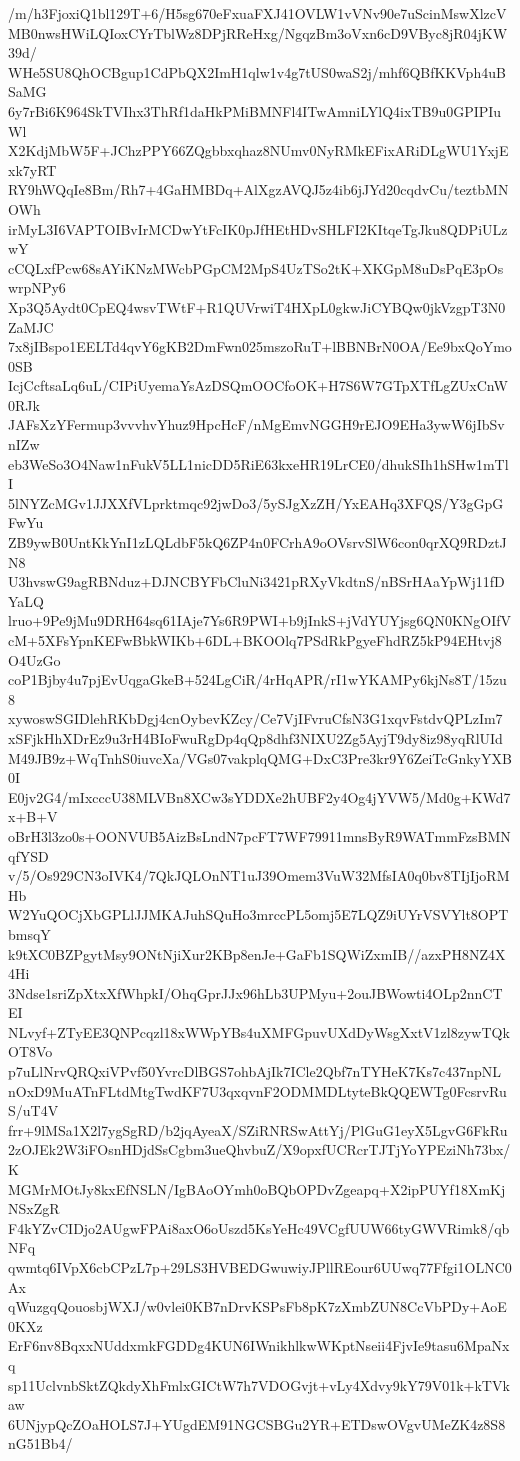 /m/h3FjoxiQ1bl129T+6/H5sg670eFxuaFXJ41OVLW1vVNv90e7uScinMswXlzcV
MB0nwsHWiLQIoxCYrTblWz8DPjRReHxg/NgqzBm3oVxn6cD9VByc8jR04jKW39d/
WHe5SU8QhOCBgup1CdPbQX2ImH1qlw1v4g7tUS0waS2j/mhf6QBfKKVph4uBSaMG
6y7rBi6K964SkTVIhx3ThRf1daHkPMiBMNFl4ITwAmniLYlQ4ixTB9u0GPIPIuWl
X2KdjMbW5F+JChzPPY66ZQgbbxqhaz8NUmv0NyRMkEFixARiDLgWU1YxjExk7yRT
RY9hWQqIe8Bm/Rh7+4GaHMBDq+AlXgzAVQJ5z4ib6jJYd20cqdvCu/teztbMNOWh
irMyL3I6VAPTOIBvIrMCDwYtFcIK0pJfHEtHDvSHLFI2KItqeTgJku8QDPiULzwY
cCQLxfPcw68sAYiKNzMWcbPGpCM2MpS4UzTSo2tK+XKGpM8uDsPqE3pOswrpNPy6
Xp3Q5Aydt0CpEQ4wsvTWtF+R1QUVrwiT4HXpL0gkwJiCYBQw0jkVzgpT3N0ZaMJC
7x8jIBspo1EELTd4qvY6gKB2DmFwn025mszoRuT+lBBNBrN0OA/Ee9bxQoYmo0SB
IcjCcftsaLq6uL/CIPiUyemaYsAzDSQmOOCfoOK+H7S6W7GTpXTfLgZUxCnW0RJk
JAFsXzYFermup3vvvhvYhuz9HpcHcF/nMgEmvNGGH9rEJO9EHa3ywW6jIbSvnIZw
eb3WeSo3O4Naw1nFukV5LL1nicDD5RiE63kxeHR19LrCE0/dhukSIh1hSHw1mTlI
5lNYZcMGv1JJXXfVLprktmqc92jwDo3/5ySJgXzZH/YxEAHq3XFQS/Y3gGpGFwYu
ZB9ywB0UntKkYnI1zLQLdbF5kQ6ZP4n0FCrhA9oOVsrvSlW6con0qrXQ9RDztJN8
U3hvswG9agRBNduz+DJNCBYFbCluNi3421pRXyVkdtnS/nBSrHAaYpWj11fDYaLQ
lruo+9Pe9jMu9DRH64sq61IAje7Ys6R9PWI+b9jInkS+jVdYUYjsg6QN0KNgOIfV
cM+5XFsYpnKEFwBbkWIKb+6DL+BKOOlq7PSdRkPgyeFhdRZ5kP94EHtvj8O4UzGo
coP1Bjby4u7pjEvUqgaGkeB+524LgCiR/4rHqAPR/rI1wYKAMPy6kjNs8T/15zu8
xywoswSGIDlehRKbDgj4cnOybevKZcy/Ce7VjIFvruCfsN3G1xqvFstdvQPLzIm7
xSFjkHhXDrEz9u3rH4BIoFwuRgDp4qQp8dhf3NIXU2Zg5AyjT9dy8iz98yqRlUId
M49JB9z+WqTnhS0iuvcXa/VGs07vakplqQMG+DxC3Pre3kr9Y6ZeiTcGnkyYXB0I
E0jv2G4/mIxcccU38MLVBn8XCw3sYDDXe2hUBF2y4Og4jYVW5/Md0g+KWd7x+B+V
oBrH3l3zo0s+OONVUB5AizBsLndN7pcFT7WF79911mnsByR9WATmmFzsBMNqfYSD
v/5/Os929CN3oIVK4/7QkJQLOnNT1uJ39Omem3VuW32MfsIA0q0bv8TIjIjoRMHb
W2YuQOCjXbGPLlJJMKAJuhSQuHo3mrccPL5omj5E7LQZ9iUYrVSVYlt8OPTbmsqY
k9tXC0BZPgytMsy9ONtNjiXur2KBp8enJe+GaFb1SQWiZxmIB//azxPH8NZ4X4Hi
3Ndse1sriZpXtxXfWhpkI/OhqGprJJx96hLb3UPMyu+2ouJBWowti4OLp2nnCTEI
NLvyf+ZTyEE3QNPcqzl18xWWpYBs4uXMFGpuvUXdDyWsgXxtV1zl8zywTQkOT8Vo
p7uLlNrvQRQxiVPvf50YvrcDlBGS7ohbAjIk7ICle2Qbf7nTYHeK7Ks7c437npNL
nOxD9MuATnFLtdMtgTwdKF7U3qxqvnF2ODMMDLtyteBkQQEWTg0FcsrvRuS/uT4V
frr+9lMSa1X2l7ygSgRD/b2jqAyeaX/SZiRNRSwAttYj/PlGuG1eyX5LgvG6FkRu
2zOJEk2W3iFOsnHDjdSsCgbm3ueQhvbuZ/X9opxfUCRcrTJTjYoYPEziNh73bx/K
MGMrMOtJy8kxEfNSLN/IgBAoOYmh0oBQbOPDvZgeapq+X2ipPUYf18XmKjNSxZgR
F4kYZvCIDjo2AUgwFPAi8axO6oUszd5KsYeHc49VCgfUUW66tyGWVRimk8/qbNFq
qwmtq6IVpX6cbCPzL7p+29LS3HVBEDGwuwiyJPllREour6UUwq77Ffgi1OLNC0Ax
qWuzgqQouosbjWXJ/w0vlei0KB7nDrvKSPsFb8pK7zXmbZUN8CcVbPDy+AoE0KXz
ErF6nv8BqxxNUddxmkFGDDg4KUN6IWnikhlkwWKptNseii4FjvIe9tasu6MpaNxq
sp11UclvnbSktZQkdyXhFmlxGICtW7h7VDOGvjt+vLy4Xdvy9kY79V01k+kTVkaw
6UNjypQcZOaHOLS7J+YUgdEM91NGCSBGu2YR+ETDswOVgvUMeZK4z8S8nG51Bb4/
